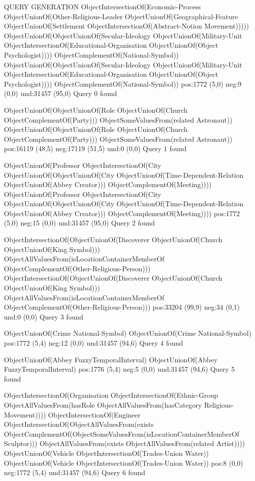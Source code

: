 QUERY GENERATION
ObjectIntersectionOf(Economic-Process ObjectUnionOf(Other-Religious-Leader ObjectUnionOf(Geographical-Feature ObjectUnionOf(Settlement ObjectIntersectionOf(Abstract-Notion Movement)))))
ObjectUnionOf(ObjectUnionOf(Secular-Ideology ObjectUnionOf(Military-Unit ObjectIntersectionOf(Educational-Organisation ObjectUnionOf(Object Psychologist)))) ObjectComplementOf(National-Symbol))
ObjectUnionOf(ObjectUnionOf(Secular-Ideology ObjectUnionOf(Military-Unit ObjectIntersectionOf(Educational-Organisation ObjectUnionOf(Object Psychologist)))) ObjectComplementOf(National-Symbol))
pos:1772 (5,0)		 neg:9 (0,0)		 und:31457 (95,0)
Query 0 found

ObjectUnionOf(ObjectUnionOf(Role ObjectUnionOf(Church ObjectComplementOf(Party))) ObjectSomeValuesFrom(related Astronaut))
ObjectUnionOf(ObjectUnionOf(Role ObjectUnionOf(Church ObjectComplementOf(Party))) ObjectSomeValuesFrom(related Astronaut))
pos:16119 (48,5)		 neg:17119 (51,5)		 und:0 (0,0)
Query 1 found

ObjectUnionOf(Professor ObjectIntersectionOf(City ObjectUnionOf(ObjectUnionOf(City ObjectUnionOf(Time-Dependent-Relation ObjectUnionOf(Abbey Creator))) ObjectComplementOf(Meeting))))
ObjectUnionOf(Professor ObjectIntersectionOf(City ObjectUnionOf(ObjectUnionOf(City ObjectUnionOf(Time-Dependent-Relation ObjectUnionOf(Abbey Creator))) ObjectComplementOf(Meeting))))
pos:1772 (5,0)		 neg:15 (0,0)		 und:31457 (95,0)
Query 2 found

ObjectIntersectionOf(ObjectUnionOf(Discoverer ObjectUnionOf(Church ObjectUnionOf(King Symbol))) ObjectAllValuesFrom(isLocationContainerMemberOf ObjectComplementOf(Other-Religious-Person)))
ObjectIntersectionOf(ObjectUnionOf(Discoverer ObjectUnionOf(Church ObjectUnionOf(King Symbol))) ObjectAllValuesFrom(isLocationContainerMemberOf ObjectComplementOf(Other-Religious-Person)))
pos:33204 (99,9) 	neg:34 (0,1)		 und:0 (0,0)
Query 3 found

ObjectUnionOf(Crime National-Symbol)
ObjectUnionOf(Crime National-Symbol)
pos:1772 (5,4)		 neg:12 (0,0)		 und:31457 (94,6)
Query 4 found

ObjectUnionOf(Abbey FuzzyTemporalInterval)
ObjectUnionOf(Abbey FuzzyTemporalInterval)
pos:1776 (5,4)	neg:5 (0,0)		 und:31457 (94,6)
Query 5 found

ObjectIntersectionOf(Organisation ObjectIntersectionOf(Ethnic-Group ObjectAllValuesFrom(hasRole ObjectAllValuesFrom(hasCategory Religious-Movement))))
ObjectIntersectionOf(Engineer ObjectIntersectionOf(ObjectAllValuesFrom(exists ObjectComplementOf(ObjectSomeValuesFrom(isLocationContainerMemberOf Sculptor))) ObjectAllValuesFrom(exists ObjectAllValuesFrom(related Artist))))
ObjectUnionOf(Vehicle ObjectIntersectionOf(Trades-Union Water))
ObjectUnionOf(Vehicle ObjectIntersectionOf(Trades-Union Water))
pos:8 (0,0)		 neg:1772 (5,4)		 und:31457 (94,6)
Query 6 found

